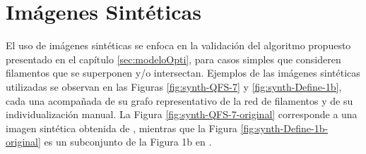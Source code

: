 \section{Im\'agenes Sint\'eticas}
\label{sec:SynthImgMethod}
El uso de im\'agenes sint\'eticas se enfoca en la validaci\'on del algoritmo propuesto presentado en el cap\'itulo \ref{sec:modeloOpti}, para casos simples que consideren filamentos que se superponen y/o intersectan. Ejemplos de las im\'agenes sint\'eticas utilizadas se observan en las Figuras \ref{fig:synth-QFS-7} y \ref{fig:synth-Define-1b}, cada una acompa\~nada de su grafo representativo de la red de filamentos y de su individualizaci\'on manual. La Figura \ref{fig:synth-QFS-7-original} corresponde a una imagen sint\'etica obtenida de \citet{qiu2014quantitative}, mientras que la Figura \ref{fig:synth-Define-1b-original} es un subconjunto de la Figura 1b  en \citet{breuer2015define}. 

